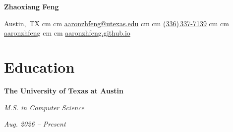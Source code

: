 \documentclass[10pt, letterpaper]{article}
\newenvironment{twocolentry}[2][]{
    \onecolentry
    \def\secondColumn{#2}
    \setcolumnwidth{\fill, 4.5 cm}
    \begin{paracol}{2}
}{
    \switchcolumn \raggedleft \secondColumn
    \end{paracol}
    \endonecolentry
}
\newenvironment{header}{
    \setlength{\topsep}{0pt}\par\kern\topsep\centering\linespread{1.5}
}{
    \par\kern\topsep
}
\newcommand{\AND}{\unskip\enspace\textbar\enspace}
\let\hrefWithoutArrow\href
\renewcommand{\href}[2]{\hrefWithoutArrow{#1}{\ifthenelse{\equal{#2}{}}{ }{#2}}}
\begin{document}
    \begin{header}
        \textbf{\fontsize{24 pt}{24 pt}\selectfont Zhaoxiang Feng}

        \vspace{0.3 cm}

        \small
        \mbox{{\color{black}\footnotesize\faMapMarker*}\hspace*{0.13cm}Austin, TX}%
         cm%
        \AND%
         cm%
        \mbox{\hrefWithoutArrow{mailto:aaronzhfeng@utexas.edu}{\color{black}{\footnotesize\faEnvelope[regular]}\hspace*{0.13cm}aaronzhfeng@utexas.edu}}%
         cm%
        \AND%
         cm%
        \mbox{\hrefWithoutArrow{tel:+13363377139}{\color{black}{\footnotesize\faPhone*}\hspace*{0.13cm}(336)\,337-7139}}%
         cm%
        \AND%
         cm%
        \mbox{\hrefWithoutArrow{https://github.com/aaronzhfeng}{\color{black}{\footnotesize\faGithub}\hspace*{0.13cm}aaronzhfeng}}%
         cm%
        \AND%
         cm%
        \mbox{\hrefWithoutArrow{https://aaronzhfeng.github.io/}{\color{black}{\footnotesize\faGlobe}\hspace*{0.13cm}aaronzhfeng.github.io}}%

    \end{header}

    \vspace{0.3 cm - 0.3 cm}

    \section{Education}

    \begin{twocolentry}{\textit{Aug. 2026 -- Present}}
        \textbf{The University of Texas at Austin}

        \textit{M.S. in Computer Science}
    \end{twocolentry}

    \vspace{0.20 cm}
\end{document}
